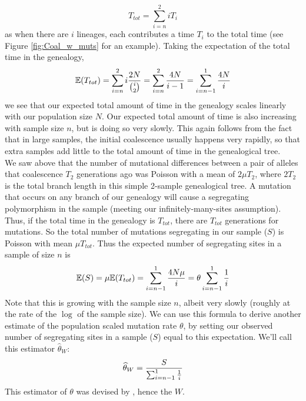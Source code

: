 \begin{equation}
T_{tot} = \sum_{i=n}^2 iT_i
\end{equation}
as when there are $i$ lineages, each contributes a time $T_i$ to the total time (see Figure \ref{fig:Coal_w_muts} for an example). Taking the expectation of the total time in the genealogy,
\begin{equation}
\E(T_{tot}) = \sum_{i=n}^2 i \frac{2N}{{i \choose
 2} } = \sum_{i=n}^2 \frac{4N}{i -1} =\sum_{i=n-1}^1 \frac{4N}{i} \label{eqn:E_T_tot}
\end{equation}
we see that our expected total amount of time in the genealogy scales linearly
with our population size $N$. Our expected total amount of time is also
increasing with sample size $n$, but is doing so very slowly. %
This again follows
from the fact that in large samples, the initial coalescence usually
happens very rapidly, so that extra samples add little to the total
amount of time in the genealogical tree. \\

We saw above that the number of mutational differences between a pair
of alleles that coalescence $T_2$ generations ago was Poisson with a
mean of $2 \mu T_2$, where $2T_{2}$ is the total branch length in this simple 2-sample genealogical tree. A mutation that occurs on any branch of our
genealogy will cause a segregating polymorphism in the sample
(meeting our infinitely-many-sites assumption). Thus, if the total time
in the genealogy is $T_{tot}$, there are $T_{tot}$
generations for mutations. So the total number of mutations
segregating in our sample ($S$) is Poisson with mean $\mu T_{tot}$. Thus the
expected number of segregating  sites in a sample of size $n$ is
\begin{equation}
\E(S) = \mu \E(T_{tot}) = \sum_{i=n-1}^1 \frac{4N\mu }{i} = \theta
\sum_{i=n-1}^1 \frac{1}{i}
\end{equation}
Note that this is growing with the sample size $n$, albeit very slowly (roughly at the rate of the $\log$ of the sample size). 
We can use this formula to derive another estimate of the population scaled mutation rate $\theta$, by setting our observed number of segregating sites in a sample ($S$) equal to this expectation. We'll call this estimator $\widehat{\theta}_W$:
\begin{equation}
\widehat{\theta}_W =\frac{ S}{\sum_{i=n-1}^1 \nicefrac{1}{i}}   \label{watterson_theta}
\end{equation}
This estimator of $\theta$ was devised by \citet{watterson:75}, hence the $W$.


